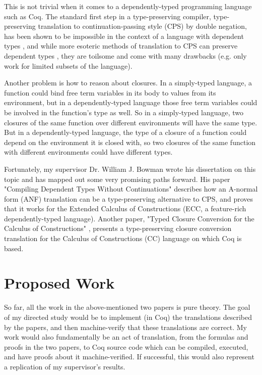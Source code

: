 \documentclass[manuscript]{acmart}
\begin{document}
This is not trivial when it comes to a dependently-typed programming language such as Coq. The standard first step in a type-preserving compiler, type-preserving translation to continuation-passing style (CPS) by double negation, has been shown to be impossible in the context of a language with dependent types \cite{Barthe:2002:CTI:509799.503043}, and while more esoteric methods of translation to CPS can preserve dependent types \cite{Bowman:2017:TCT:3177123.3158110}, they are toilsome and come with many drawbacks (e.g. only work for limited subsets of the language).

Another problem is how to reason about closures. In a simply-typed language, a function could bind free term variables in its body to values from its environment, but in a dependently-typed language those free term variables could be involved in the function's type as well. So in a simply-typed language, two closures of the same function over different environments will have the same type. But in a dependently-typed language, the type of a closure of a function could depend on the environment it is closed with, so two closures of the same function with different environments could have different types.

Fortunately, my supervisor Dr. William J. Bowman wrote his dissertation on this topic and has mapped out some very promising paths forward. His paper "Compiling Dependent Types Without Continuations" \cite{bowman_ahmed_2019} describes how an A-normal form (ANF) translation can be a type-preserving alternative to CPS, and proves that it works for the Extended Calculus of Constructions (ECC, a feature-rich dependently-typed language). Another paper, "Typed Closure Conversion for the Calculus of Constructions" \cite{bowman_ahmed_2018}, presents a type-preserving closure conversion translation for the Calculus of Constructions (CC) language on which Coq is based.

\section{Proposed Work}

So far, all the work in the above-mentioned two papers is pure theory. The goal of my directed study would be to implement (in Coq) the translations described by the papers, and then machine-verify that these translations are correct. My work would also fundamentally be an act of translation, from the formulas and proofs in the two papers, to Coq source code which can be compiled, executed, and have proofs about it machine-verified. If successful, this would also represent a replication of my supervisor's results.
\end{document}
